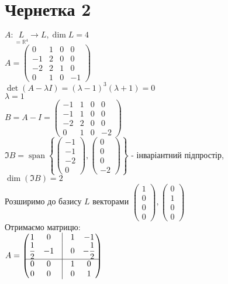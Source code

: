 \documentclass[a4paper, 10pt]{article}
\theoremstyle{theoremdd}
\DeclareMathOperator{\linspan}{span}
\begin{document}
\section*{Чернетка 2}
$A: \underset{= \mathbb{R}^4}{L} \to L, \dim L = 4$\\
$A = \begin{pmatrix}
0 & 1 & 0 & 0 \\
-1 & 2 & 0 & 0 \\
-2 & 2 & 1 & 0 \\
0 & 1 & 0 & -1
\end{pmatrix}$\\
$\det(A-\lambda I) = (\lambda - 1)^3(\lambda + 1) = 0$\\
$\lambda = 1$\\
$B = A - I = \begin{pmatrix}
-1 & 1 & 0 & 0 \\
-1 & 1 & 0 & 0 \\
-2 & 2 & 0 & 0 \\
0 & 1 & 0 & -2
\end{pmatrix}$\\
$\Im B = \linspan\left\{ \begin{pmatrix} -1 \\ -1 \\ -2 \\ 0 \end{pmatrix}, \begin{pmatrix} 0 \\ 0 \\ 0 \\ -2 \end{pmatrix} \right\}$ - інваріантний підпростір, \\ $\dim (\Im B) = 2$\\
Розширимо до базису $L$ векторами $\begin{pmatrix} 1 \\ 0 \\ 0 \\ 0 \end{pmatrix}, \begin{pmatrix} 0 \\ 1 \\ 0 \\ 0 \end{pmatrix}$\\
Отримаємо матрицю:\\
$A = \begin{pmatrix}
1 & 0 & \vline & 1 & -1 \\
\dfrac{1}{2} & -1 & \vline & 0 & -\dfrac{1}{2} \\
\hline
0 & 0 & \vline & 1 & 0 \\
0 & 0 & \vline & 0 & 1
\end{pmatrix}$\\
\end{document}
